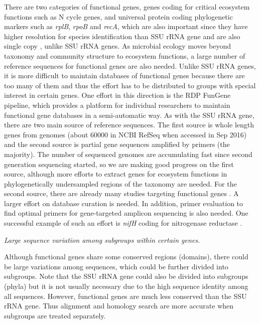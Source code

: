 \documentclass[]{msu-thesis}
\begin{document}
There are two categories of functional genes, genes coding for critical
ecosystem functions such as N cycle genes, and universal protein coding
phylogenetic markers such as \textit{rplB}, \textit{rpoB} and
\textit{recA}, which are also important since they have higher
resolution for species identification than SSU rRNA gene and are also
single copy \cite{case_use_2007,roux_comparison_2011}, unlike SSU rRNA
genes.  As microbial ecology moves beyond taxonomy and community
structure to ecosystem functions, a large number of reference sequences
for functional genes are also needed. Unlike SSU rRNA genes, it is more
difficult to maintain databases of functional genes because there are
too many of them and thus the effort has to be distributed to groups
with special interest in certain genes. One effort in this direction is
the RDP FunGene pipeline, which provides a platform for individual
researchers to maintain functional gene databases in a semi-automatic
way. As with the SSU rRNA gene, there are two main source of reference
sequences. The first source is whole length genes from genomes (about
60000 in NCBI RefSeq when accessed in Sep 2016) and the second source is
partial gene sequences amplified by primers (the majority). The number
of sequenced genomes are accumulating fast since second generation
sequencing started, so we are making good progress on the first source,
although more efforts to extract genes for ecosystem functions in
phylogenetically undersampled regions of the taxonomy are needed. For
the second source, there are already many studies targeting functional
genes
\cite{penton_functional_2013,hai_quantification_2009,treusch_novel_2005,huang_biodiversity_2011}.
A larger effort on database curation is needed. In addition, primer
evaluation to find optimal primers for gene-targeted amplicon sequencing
is also needed. One successful example of such an effort is
\textit{nifH} coding for nitrogenase reductase
\cite{gaby_comprehensive_2014,gaby_comprehensive_2012}.

\textit{Large sequence variation among subgroups within certain genes. }

Although functional genes share some conserved regions (domains), there
could be large variations among sequences, which could be further
divided into subgroups. Note that the SSU rRNA gene could also be
divided into subgroups (phyla) but it is not usually necessary due to
the high sequence identity among all sequences. However, functional
genes are much less conserved than the SSU rRNA gene. Thus alignment and
homology search are more accurate when subgroups are treated separately.
\end{document}
